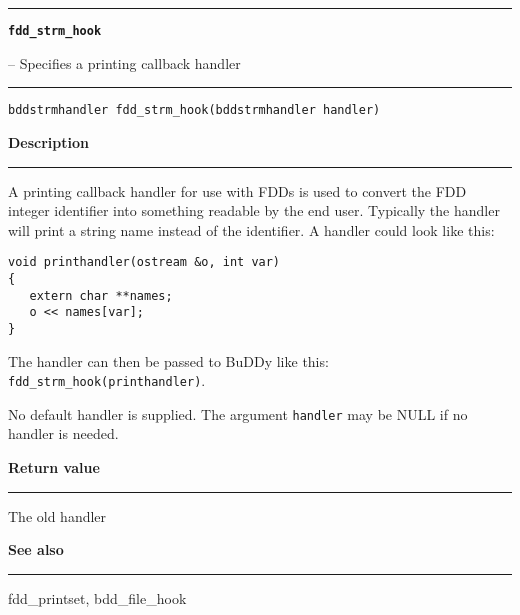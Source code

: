 \begin{minipage}{\textwidth}

\noindent\begin{minipage}{\textwidth}
\rule{\textwidth}{0.5mm}
{\tt\bf fdd\_strm\_hook }
\--- Specifies a printing callback handler  \hspace{\fill}
\\\rule[1.5ex]{\textwidth}{0.5mm}
\end{minipage}

\noindent\begin{verbatim}
bddstrmhandler fdd_strm_hook(bddstrmhandler handler) 
\end{verbatim}

\vspace{\parsep}\noindent
{\bf Description}\\\rule[1.5ex]{\textwidth}{0.2mm}\vspace{-1.5ex}\setlength{\parindent}{1em}
A printing callback handler for use with FDDs is used to
           convert the FDD integer identifier into something readable by the
	   end user. Typically the handler will print a string name
	   instead of the identifier. A handler could look like this:
	   \begin{verbatim}
void printhandler(ostream &o, int var)
{
   extern char **names;
   o << names[var];
}
\end{verbatim}

           \noindent
           The handler can then be passed to BuDDy like this:
	   {\tt fdd\_strm\_hook(printhandler)}.

	   No default handler is supplied. The argument {\tt handler} may be
	   NULL if no handler is needed. 

\setlength{\parindent}{0em}\vspace{\parsep}\vspace{\baselineskip}\noindent
{\bf Return value}\\\rule[1.5ex]{\textwidth}{0.2mm}\vspace{-1.5ex}
The old handler 

\vspace{\parsep}\vspace{\baselineskip}\noindent
{\bf See also}\\\rule[1.5ex]{\textwidth}{0.2mm}\vspace{-1.5ex}
fdd\_printset, bdd\_file\_hook 
\end{minipage}
\vspace{8ex}
